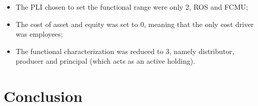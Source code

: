 \documentclass{article}
\begin{document}
\begin{itemize}
    \item The PLI chosen to set the functional range were only 2, ROS and FCMU;
    \item The cost of asset and equity was set to 0, meaning that the only cost driver was employees;
    \item The functional characterization was reduced to 3, namely distributor, producer and principal (which acts as an active holding).
\end{itemize}


\section{Conclusion}


\newpage
\printbibliography
\end{document}

